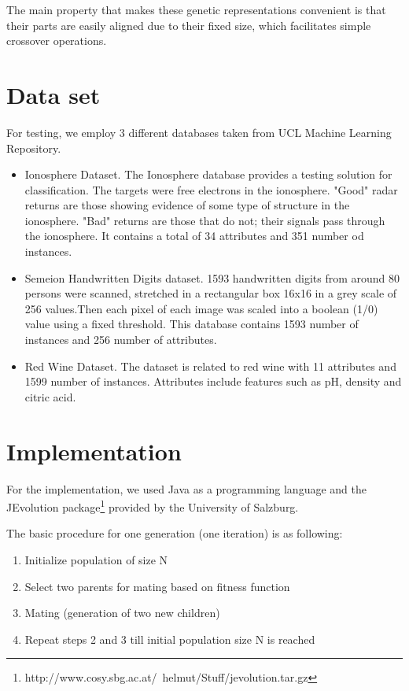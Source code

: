 \documentclass[11pt,onecolumn,a4paper]{article}
\begin{document}
  The main property that makes these genetic representations convenient is that their parts are easily aligned due to their fixed size, which facilitates simple crossover operations.
\section{Data set}
\label{sec:eval}
For testing, we employ 3 different databases taken from UCL Machine Learning Repository. 

\begin{itemize}
	\item Ionosphere Dataset. The Ionosphere database  provides a testing solution for classification.  The targets were free electrons in the ionosphere. "Good" radar returns are those showing evidence of some type of structure in the ionosphere. "Bad" returns are those that do not; their signals pass through the ionosphere. It contains a total of 34 attributes and 351 number od instances. \cite{ucl1}
	
	\item Semeion Handwritten Digits dataset. 1593 handwritten digits from around 80 persons were scanned, stretched in a rectangular box 16x16 in a grey scale of 256 values.Then each pixel of each image was scaled into a boolean (1/0) value using a fixed threshold. This database contains 1593 number of instances and 256 number of attributes. \cite{ucl2}
	\item Red Wine Dataset. The dataset is related to red wine with 11 attributes and 1599 number of instances. Attributes include features such as pH, density and citric acid. \cite{ucl3}
\end{itemize}



\section{Implementation}
\label{sec:eval}

For the implementation, we used Java as a programming language and the JEvolution package\footnote{http://www.cosy.sbg.ac.at/~helmut/Stuff/jevolution.tar.gz} provided by the University of Salzburg.

The basic procedure for one generation (one iteration) is as following:

\begin{enumerate}
\item {Initialize population of size N}
\item {Select two parents for mating based on fitness function}
\item {Mating (generation of two new children)}
\item{Repeat steps 2 and 3 till initial population size N is reached}
\end{enumerate}   
\end{document}
